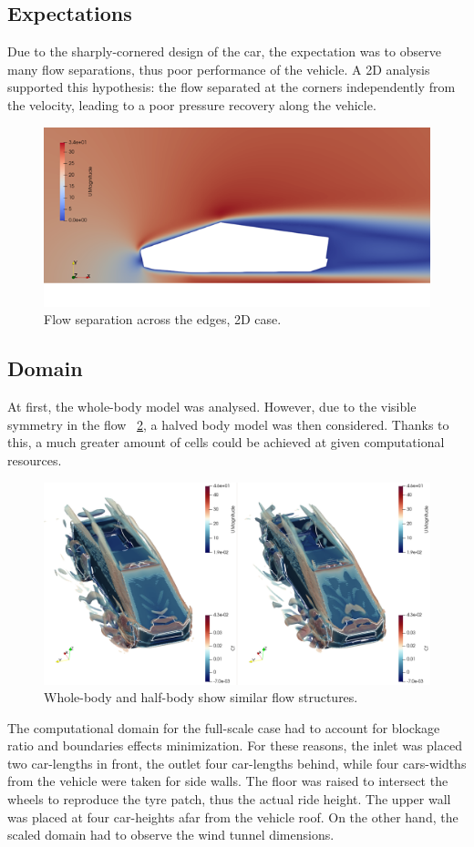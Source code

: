 \documentclass{elbioimp2}
\begin{document}
\subsection{Expectations}
Due to the sharply-cornered design of the car, the expectation was to observe many flow separations, thus poor performance of the vehicle. A 2D analysis supported this hypothesis: the flow separated at the corners independently from the velocity, leading to a poor pressure recovery along the vehicle. 
\begin{figure}[htp]
  \centering
  \includegraphics[width=0.9\columnwidth]{2d.png}
  \caption{Flow separation across the edges, 2D case.\label{}}
\end{figure}

\subsection{Domain}
At first, the whole-body model was analysed. However, due to the visible symmetry in the flow ~\ref{full-half comparison}, a halved body model was then considered. Thanks to this, a much greater amount of cells could be achieved at given computational resources.
\begin{figure}[htp]
  \centering
  \includegraphics[width=0.9\columnwidth]{fullhalf.png}
  \caption{Whole-body and half-body show similar flow structures.\label{full-half comparison}}
\end{figure}
The computational domain for the full-scale case had to account for blockage ratio and boundaries effects minimization. For these reasons,  the inlet was placed two car-lengths in front, the outlet four car-lengths behind, while four cars-widths from the vehicle were taken for side walls. The floor was raised to intersect the wheels to reproduce the tyre patch, thus the actual ride height. The upper wall was placed at four car-heights afar from the vehicle roof.
On the other hand, the scaled domain had to observe the wind tunnel dimensions.\\ \noindent
\end{document}
